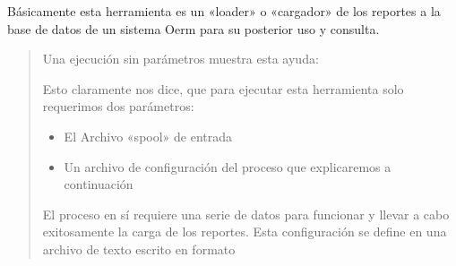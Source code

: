 \documentclass[a4paper,12pt,spanish]{sphinxmanual}
\begin{document}
Básicamente esta herramienta es un «loader» o «cargador» de los reportes a la
base de datos de un sistema Oerm para su posterior uso y consulta.
\begin{quote}

Una ejecución sin parámetros muestra esta ayuda:

\begin{sphinxVerbatim}[commandchars=\\\{\}]
  \PYG{p}{[}\PYG{p}{]} \PYG{p}{[} \PYG{p}{]} 

          

 
                                  

 
                                    
         
\end{sphinxVerbatim}

Esto claramente nos dice, que para ejecutar esta herramienta solo requerimos
dos parámetros:
\begin{itemize}
\item {} 
El Archivo «spool» de entrada

\item {} 
Un archivo de configuración del proceso que explicaremos a continuación

\end{itemize}

El proceso en sí requiere una serie de datos para funcionar y llevar a cabo
exitosamente la carga de los reportes. Esta configuración se define en una
archivo de texto escrito en formato 


\end{quote}
\end{document}
